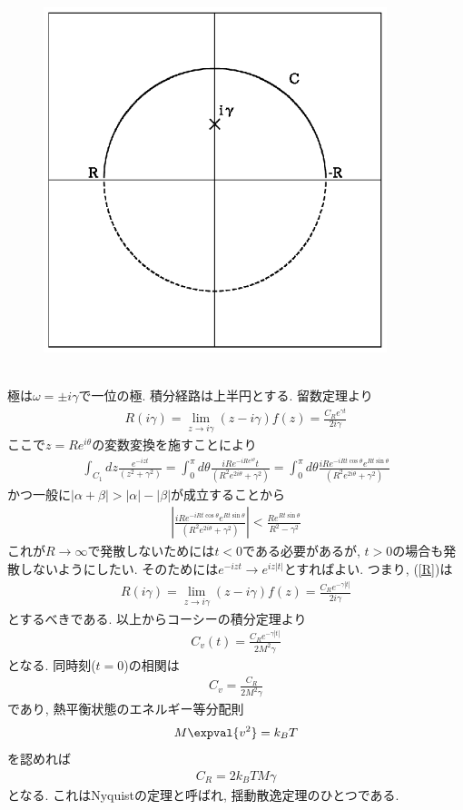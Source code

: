 \documentclass[10.5pt,a4paper]{jreport}
\begin{document}
\begin{figure}[htbp]
  \centering
  \includegraphics[width = 10cm]{./EPS/figure3new.eps}
  \label{fig3}
\end{figure}\\
極は$\omega = \pm i\gamma$で一位の極. 積分経路は上半円とする. 留数定理より
\begin{eqnarray}
  R(i\gamma) = \lim_{z\rightarrow i\gamma}(z - i\gamma)f(z) = \frac{C_Re^{\gamma t}}{2i\gamma}\label{R}
\end{eqnarray}
ここで$z = Re^{i\theta}$の変数変換を施すことにより
\begin{eqnarray}
  \int_{C_1}dz\frac{e^{-izt}}{(z^2 + \gamma^2)} = \int_0^\pi d\theta\frac{iRe^{-iRe^{i\theta}}t}{(R^2e^{2i\theta} + \gamma^2)}= \int_0^\pi d\theta\frac{iRe^{-iRt\cos\theta}e^{Rt\sin\theta}}{(R^2e^{2i\theta} + \gamma^2)}
\end{eqnarray}
かつ一般に$|\alpha + \beta| > |\alpha|-|\beta|$が成立することから
\begin{eqnarray}
  \left|\frac{iRe^{-iRt\cos\theta}e^{Rt\sin\theta}}{(R^2e^{2i\theta} + \gamma^2)}\right| < \frac{Re^{Rt\sin\theta}}{R^2 - \gamma^2}
\end{eqnarray}
これが$R\rightarrow\infty$で発散しないためには$t<0$である必要があるが, $t>0$の場合も発散しないようにしたい. そのためには$e^{-izt}\rightarrow e^{iz|t|}$とすればよい. つまり, (\ref{R})は
\begin{eqnarray}
  R(i\gamma) = \lim_{z\rightarrow i\gamma}(z - i\gamma)f(z) = \frac{C_Re^{-\gamma |t|}}{2i\gamma}\label{R2}
\end{eqnarray}
とするべきである. 以上からコーシーの積分定理より
\begin{eqnarray}
  C_v(t) = \frac{C_Re^{-\gamma|t|}}{2M^2\gamma}
\end{eqnarray}
となる. 同時刻($t = 0$)の相関は
\begin{eqnarray}
  C_v = \frac{C_R}{2M^2\gamma}
\end{eqnarray}
であり, 熱平衡状態のエネルギー等分配則
\begin{eqnarray}
  M\expval{v^2} = k_BT
\end{eqnarray}
を認めれば
\begin{eqnarray}
  C_R = 2k_BTM\gamma
\end{eqnarray}
となる. これはNyquistの定理と呼ばれ, 揺動散逸定理のひとつである.
\end{document}
